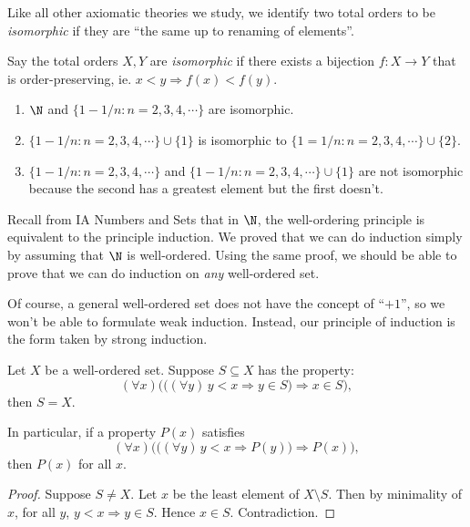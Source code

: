 \documentclass[a4paper]{article}
\begin{document}
Like all other axiomatic theories we study, we identify two total orders to be \emph{isomorphic} if they are ``the same up to renaming of elements''.
\begin{defi}
  Say the total orders $X, Y$ are \emph{isomorphic} if there exists a bijection $f: X\to Y$ that is order-preserving, ie. $x < y \Rightarrow f(x) < f(y)$.
\end{defi}

\begin{eg}\leavevmode
\begin{enumerate}
  \item $\N$ and $\{1 - 1/n: n = 2, 3, 4, \cdots\}$ are isomorphic.
  \item $\{1 - 1/n:n = 2, 3, 4, \cdots\}\cup \{1\}$ is isomorphic to $\{1 = 1/n: n = 2, 3, 4, \cdots\} \cup \{2\}$.
  \item $\{1 - 1/n: n = 2, 3, 4, \cdots\}$ and $\{1 - 1/n: n = 2, 3, 4, \cdots\}\cup \{1\}$ are not isomorphic because the second has a greatest element but the first doesn't.
\end{enumerate}
\end{eg}

Recall from IA Numbers and Sets that in $\N$, the well-ordering principle is equivalent to the principle induction. We proved that we can do induction simply by assuming that $\N$ is well-ordered. Using the same proof, we should be able to prove that we can do induction on \emph{any} well-ordered set.

Of course, a general well-ordered set does not have the concept of ``$+1$'', so we won't be able to formulate weak induction. Instead, our principle of induction is the form taken by strong induction.
\begin{prop}
  Let $X$ be a well-ordered set. Suppose $S \subseteq X$ has the property:
  \[
    (\forall x)\Big(\big((\forall y)\, y < x \Rightarrow y\in S\big) \Rightarrow x\in S\Big),
  \]
  then $S = X$.

  In particular, if a property $P(x)$ satisfies
  \[
    (\forall x)\Big(\big((\forall y)\, y < x \Rightarrow P(y)\big)\Rightarrow P(x)\Big),
  \]
  then $P(x)$ for all $x$.
\end{prop}

\begin{proof}
  Suppose $S\not=X$. Let $x$ be the least element of $X\setminus S$. Then by minimality of $x$, for all $y$, $y < x \Rightarrow y\in S$. Hence $x\in S$. Contradiction.
\end{proof}
\end{document}
